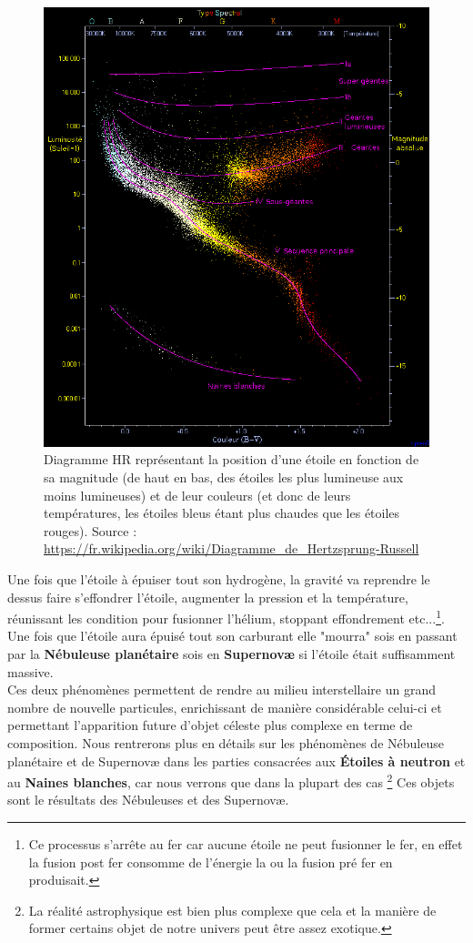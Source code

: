 \documentclass[a4paper]{rapport}
\begin{document}
\begin{figure}
    \center
    \includegraphics[scale=0.2]{hr_diagram_wikipedia}
    \caption{Diagramme HR représentant la position d'une étoile en fonction de sa magnitude (de haut en bas, des étoiles les plus lumineuse aux moins lumineuses) et de leur couleurs (et donc de leurs températures, les étoiles bleus étant plus chaudes que les étoiles rouges). Source : \url{https://fr.wikipedia.org/wiki/Diagramme_de_Hertzsprung-Russell}}
\end{figure}
Une fois que l'étoile à épuiser tout son hydrogène, la gravité va reprendre le dessus faire s’effondrer l'étoile, augmenter la pression et la température, réunissant les condition pour fusionner l'hélium, stoppant effondrement etc...\footnote{Ce processus s’arrête au fer car aucune étoile ne peut fusionner le fer, en effet la fusion post fer consomme de l'énergie la ou la fusion pré fer en produisait.}. Une fois que l'étoile aura épuisé tout son carburant elle "mourra" sois en passant par la \textbf{Nébuleuse planétaire} sois en \textbf{Supernovæ} si l'étoile était suffisamment massive.\\
Ces deux phénomènes permettent de rendre au milieu interstellaire un grand nombre de nouvelle particules, enrichissant de manière considérable celui-ci et permettant l'apparition future d'objet céleste plus complexe en terme de composition.
\nl
Nous rentrerons plus en détails sur les phénomènes de Nébuleuse planétaire et de Supernovæ dans les parties consacrées aux \textbf{Étoiles à neutron} et au \textbf{Naines blanches}, car nous verrons que dans la plupart des cas \footnote{La réalité astrophysique est bien plus complexe que cela et la manière de former certains objet de notre univers peut être assez exotique.} Ces objets sont le résultats des Nébuleuses et des Supernovæ.
\end{document}
